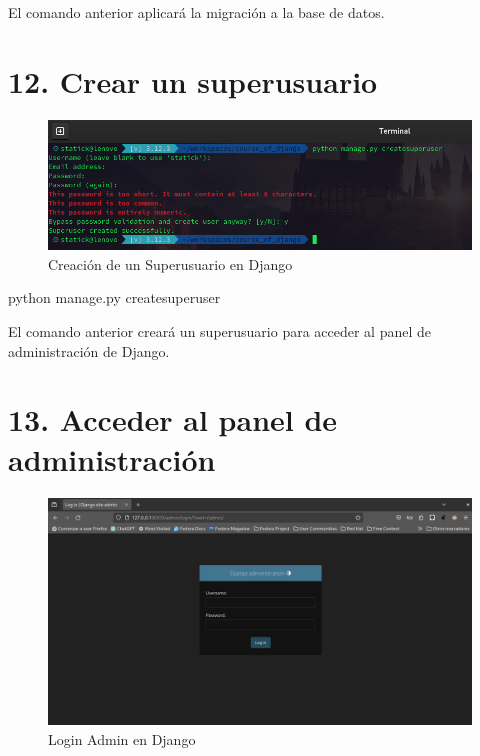 \documentclass[
  a4paper,
  DIV=11,
  numbers=noendperiod,
  onepage,
  openany]{scrreprt}
\newenvironment{Shaded}{\begin{snugshade}}{\end{snugshade}}
\newcommand{\ExtensionTok}[1]{\textcolor[rgb]{0.00,0.23,0.31}{#1}}
\newcommand{\NormalTok}[1]{\textcolor[rgb]{0.00,0.23,0.31}{#1}}
\begin{document}
El comando anterior aplicará la migración a la base de datos.

\section{12. Crear un superusuario}\label{crear-un-superusuario}

\begin{figure}[H]

{\centering \includegraphics{images/creacion_superusuario_django.png}

}

\caption{Creación de un Superusuario en Django}

\end{figure}%

\begin{Shaded}
\begin{Highlighting}[]
\ExtensionTok{python}\NormalTok{ manage.py createsuperuser}
\end{Highlighting}
\end{Shaded}

El comando anterior creará un superusuario para acceder al panel de
administración de Django.

\section{13. Acceder al panel de
administración}\label{acceder-al-panel-de-administraciuxf3n}

\begin{figure}[H]

{\centering \includegraphics{images/login_admin_django.png}

}

\caption{Login Admin en Django}

\end{figure}%
\end{document}
